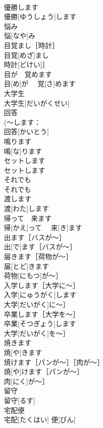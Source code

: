 \documentclass[8pt]{extreport}
\begin{document}
\begin{CJK}{UTF8}{min}
\\	優勝します	
\\	優勝[ゆうしょう]します	
\\	悩み	
\\	悩[なや]み	
\\	目覚まし［時計］	
\\	目覚[めざ]まし
\\	時計[どけい]］	
\\	目が　覚めます	
\\	目[め]が　 覚[さ]めます	
\\	大学生	
\\	大学生[だいがくせい]	
\\	回答	
\\	(〜します：
\\	回答[かいとう]	
\\	鳴ります	
\\	鳴[な]ります	
\\	セットします	
\\	セットします	
\\	それでも	
\\	それでも	
\\	渡します	
\\	渡[わた]します	
\\	帰って　来ます	
\\	帰[かえ]って　 来[き]ます	
\\	出ます［バスが〜］	
\\	出[で]ます［バスが〜］	
\\	届きます［荷物が〜］	
\\	届[とど]きます
\\	荷物[にもつ]が〜］	
\\	入学します［大学に〜］	
\\	入学[にゅうがく]します
\\	大学[だいがく]に〜］	
\\	卒業します［大学を〜］	
\\	卒業[そつぎょう]します
\\	大学[だいがく]を〜］	
\\	焼きます	
\\	焼[や]きます	
\\	焼けます［パンが〜］［肉が〜］	
\\	焼[や]けます［パンが〜］
\\	肉[にく]が〜］	
\\	留守	
\\	留守[るす]	
\\	宅配便	
\\	宅配[たくはい] 便[びん]	

\end{CJK}
\end{document}
